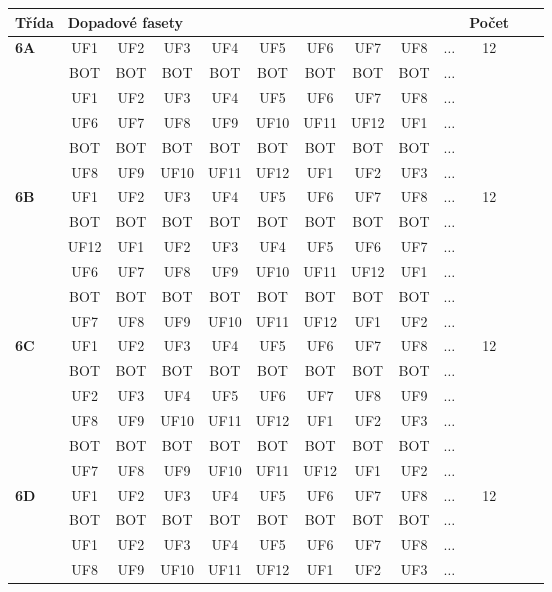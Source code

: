 \begin{table}[h!]
\centering
\begin{tabular}{|l|c|c|c|c|c|c|c|c|c|c|c|c|}
\hline
Třída &  \multicolumn{9}{l}{Dopadové fasety} \vline  & Počet\\
\hline \hline
\textbf{6A} & UF1 & UF2 & UF3 & UF4 & UF5 & UF6 & UF7 & UF8 & $\dots$ & 12\\
 & BOT & BOT & BOT & BOT & BOT & BOT & BOT & BOT & $\dots$ & \\
 & UF1 & UF2 & UF3 & UF4 & UF5 & UF6 & UF7 & UF8 & $\dots$ & \\
 & UF6 & UF7 & UF8 & UF9 & UF10 & UF11 & UF12 & UF1 & $\dots$ & \\
 & BOT & BOT & BOT & BOT & BOT & BOT & BOT & BOT & $\dots$ & \\
 & UF8 & UF9 & UF10 & UF11 & UF12 & UF1 & UF2 & UF3 & $\dots$ & \\
\hline \hline
\textbf{6B} & UF1 & UF2 & UF3 & UF4 & UF5 & UF6 & UF7 & UF8 & $\dots$ & 12\\
 & BOT & BOT & BOT & BOT & BOT & BOT & BOT & BOT & $\dots$ & \\
 & UF12 & UF1 & UF2 & UF3 & UF4 & UF5 & UF6 & UF7 & $\dots$ & \\
 & UF6 & UF7 & UF8 & UF9 & UF10 & UF11 & UF12 & UF1 & $\dots$ & \\
 & BOT & BOT & BOT & BOT & BOT & BOT & BOT & BOT & $\dots$ & \\
 & UF7 & UF8 & UF9 & UF10 & UF11 & UF12 & UF1 & UF2 & $\dots$ & \\
\hline \hline
\textbf{6C} & UF1 & UF2 & UF3 & UF4 & UF5 & UF6 & UF7 & UF8 & $\dots$ & 12\\
 & BOT & BOT & BOT & BOT & BOT & BOT & BOT & BOT & $\dots$ & \\
 & UF2 & UF3 & UF4 & UF5 & UF6 & UF7 & UF8 & UF9 & $\dots$ & \\
 & UF8 & UF9 & UF10 & UF11 & UF12 & UF1 & UF2 & UF3 & $\dots$ & \\
 & BOT & BOT & BOT & BOT & BOT & BOT & BOT & BOT & $\dots$ & \\
 & UF7 & UF8 & UF9 & UF10 & UF11 & UF12 & UF1 & UF2 & $\dots$ & \\
\hline \hline
\textbf{6D} & UF1 & UF2 & UF3 & UF4 & UF5 & UF6 & UF7 & UF8 & $\dots$ & 12\\
 & BOT & BOT & BOT & BOT & BOT & BOT & BOT & BOT & $\dots$ & \\
 & UF1 & UF2 & UF3 & UF4 & UF5 & UF6 & UF7 & UF8 & $\dots$ & \\
 & UF8 & UF9 & UF10 & UF11 & UF12 & UF1 & UF2 & UF3 & $\dots$ & \\

\end{tabular}
\end{table}
